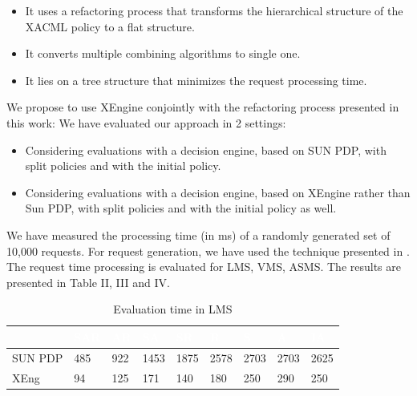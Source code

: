\begin{itemize}
\item It uses a refactoring process that transforms the hierarchical structure of the XACML policy to a flat structure. 
\item It converts multiple combining algorithms to single one.
\item It lies on a tree structure that minimizes the request processing time.
\end{itemize}
We propose to use XEngine conjointly with the refactoring process presented in this work:
We have evaluated our approach in 2 settings:
\begin{itemize}
\item Considering evaluations with a decision engine, based on SUN PDP, with split policies and with the initial policy.  
\item Considering evaluations with a decision engine, based on XEngine rather than Sun PDP, with split policies and with the initial policy as well.  
\end{itemize}
We have measured the processing time (in ms) of a randomly generated set of 10,000 requests. For request generation, we have used the technique presented 
in \cite{request}. The request time processing is evaluated for LMS, VMS, ASMS. The results are presented in Table II, III and IV.


\begin{table}[h!]
\small


\begin{tabular}{|>{\small}l|>{\small}l|>{\small}l|>{\small}l|>{\small}l|>{\small}l|>{\small}l|>{\small}l|>{\small}l|}  
\hline  \rowcolor{black} \scriptsize \bf \textcolor {white}{}
& \scriptsize \bf \textcolor {white}{SAR}
& \scriptsize \bf \textcolor {white}{AR}
& \scriptsize \bf \textcolor  {white}{SA}
& \scriptsize \bf \textcolor  {white}{SR}
& \scriptsize \bf \textcolor  {white}{R}

& \scriptsize \bf \textcolor  {white}{S} 
& \scriptsize \bf \textcolor  {white}{A}
& \scriptsize \bf \textcolor {white}{IA}\\ \hline
\scriptsize  {SUN PDP}
&\scriptsize  {485}
& \scriptsize {922}
& \scriptsize {1453}
& \scriptsize {1875}
& \scriptsize {2578}

& \scriptsize {2703}
& \scriptsize {2703}
& \scriptsize {2625}
  \\ \hline
\scriptsize  {XEng}
&\scriptsize  {94}
& \scriptsize {125}
& \scriptsize {171}
& \scriptsize {140}
& \scriptsize {180}

& \scriptsize {250}
& \scriptsize {290}
& \scriptsize {250}
  \\ \hline
\end{tabular}
\caption{Evaluation time in LMS}\end{table}



